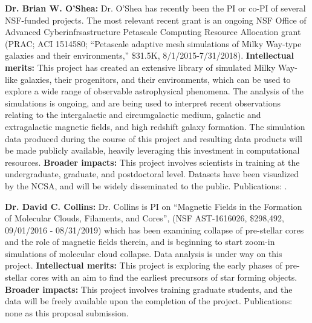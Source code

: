 \noindent \textbf{Dr. Brian W. O'Shea:} Dr. O'Shea has recently been
the PI or co-PI of several NSF-funded projects.  The most relevant
recent grant is an ongoing NSF Office of Advanced Cyberinfrsastructure
Petascale Computing Resource Allocation grant (PRAC; ACI 1514580;
``Petascale adaptive mesh simulations of Milky Way-type galaxies and
their environments,'' \$31.5K, 8/1/2015-7/31/2018).  
\textbf{Intellectual merits:} This
project has created an extensive library of simulated
Milky Way-like galaxies, their progenitors, and their environments,
which can be used to explore a wide range of observable astrophysical
phenomena.  The analysis of the simulations is ongoing, and are being
used to interpret recent observations relating to the intergalactic
and circumgalactic medium, galactic and extragalactic magnetic fields,
and high redshift galaxy formation. The simulation data produced
during the course of this project and resulting data products will be
made publicly available, heavily leveraging this investment in
computational resources.  \textbf{Broader impacts:} This project
involves scientists in training at the undergraduate,
graduate, and postdoctoral level.  Datasets have been visualized by
the NCSA, and will be widely disseminated
to the public.  Publications: \citep{Barrow17, Barrow17_FL2,
2017ApJ...847...59H, 2016ApJ...833...84X, 2016ApJ...832L...5X}.

\textbf{Dr. David C. Collins:} Dr. Collins is PI on ``Magnetic Fields in the Formation of
Molecular Clouds, Filaments, and Cores'',  (NSF AST-1616026, \$298,492,
09/01/2016 - 08/31/2019)  which has been
examining collapse of pre-stellar cores and the role of magnetic fields therein,
and is beginning to start zoom-in simulations of molecular cloud collapse.
Data analysis is under way on this project.
\textbf{Intellectual merits:} This project is exploring the early phases of
pre-stellar cores with an aim to find the earliest precursors of star forming
objects.  \textbf{Broader impacts:} This project involves training graduate
students, and the data will be freely available upon the completion of the
project.  Publications: none as this proposal submission.
